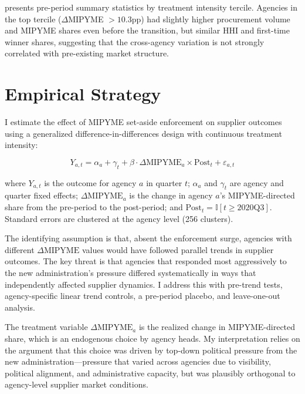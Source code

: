 \documentclass[12pt]{article}
\newcommand{\ind}{\mathbb{I}}
\begin{document}


 presents pre-period summary statistics by treatment intensity tercile. Agencies in the top tercile ($\Delta$MIPYME $> 10.3$pp) had slightly higher procurement volume and MIPYME shares even before the transition, but similar HHI and first-time winner shares, suggesting that the cross-agency variation is not strongly correlated with pre-existing market structure.

\section{Empirical Strategy}

I estimate the effect of MIPYME set-aside enforcement on supplier outcomes using a generalized difference-in-differences design with continuous treatment intensity:

\begin{equation}
Y_{a,t} = \alpha_a + \gamma_t + \beta \cdot \Delta\text{MIPYME}_a \times \text{Post}_t + \varepsilon_{a,t}
\label{eq:main}
\end{equation}

\noindent where $Y_{a,t}$ is the outcome for agency $a$ in quarter $t$; $\alpha_a$ and $\gamma_t$ are agency and quarter fixed effects; $\Delta\text{MIPYME}_a$ is the change in agency $a$'s MIPYME-directed share from the pre-period to the post-period; and $\text{Post}_t = \ind[t \geq \text{2020Q3}]$. Standard errors are clustered at the agency level (256 clusters).

The identifying assumption is that, absent the enforcement surge, agencies with different $\Delta\text{MIPYME}$ values would have followed parallel trends in supplier outcomes. The key threat is that agencies that responded most aggressively to the new administration's pressure differed systematically in ways that independently affected supplier dynamics. I address this with pre-trend tests, agency-specific linear trend controls, a pre-period placebo, and leave-one-out analysis.

The treatment variable $\Delta\text{MIPYME}_a$ is the realized change in MIPYME-directed share, which is an endogenous choice by agency heads. My interpretation relies on the argument that this choice was driven by top-down political pressure from the new administration---pressure that varied across agencies due to visibility, political alignment, and administrative capacity, but was plausibly orthogonal to agency-level supplier market conditions.
\end{document}
